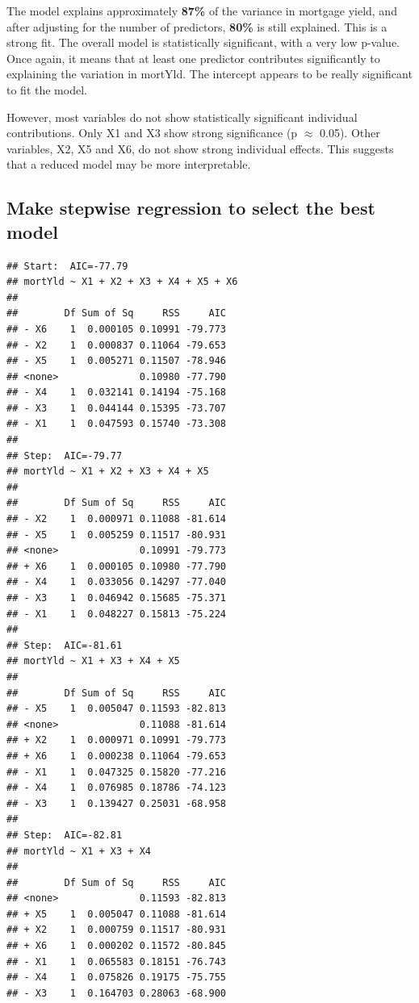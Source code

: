 \documentclass[
  11pt,
]{article}
\begin{document}
The model explains approximately \textbf{87\%} of the variance in
mortgage yield, and after adjusting for the number of predictors,
\textbf{80\%} is still explained. This is a strong fit. The overall
model is statistically significant, with a very low p-value. Once again,
it means that at least one predictor contributes significantly to
explaining the variation in mortYld. The intercept appears to be really
significant to fit the model.

However, most variables do not show statistically significant individual
contributions. Only X1 and X3 show strong significance (p \(\approx\)
0.05). Other variables, X2, X5 and X6, do not show strong individual
effects. This suggests that a reduced model may be more interpretable.

\subsection{Make stepwise regression to select the best
model}\label{make-stepwise-regression-to-select-the-best-model}

\begin{verbatim}
## Start:  AIC=-77.79
## mortYld ~ X1 + X2 + X3 + X4 + X5 + X6
## 
##        Df Sum of Sq     RSS     AIC
## - X6    1  0.000105 0.10991 -79.773
## - X2    1  0.000837 0.11064 -79.653
## - X5    1  0.005271 0.11507 -78.946
## <none>              0.10980 -77.790
## - X4    1  0.032141 0.14194 -75.168
## - X3    1  0.044144 0.15395 -73.707
## - X1    1  0.047593 0.15740 -73.308
## 
## Step:  AIC=-79.77
## mortYld ~ X1 + X2 + X3 + X4 + X5
## 
##        Df Sum of Sq     RSS     AIC
## - X2    1  0.000971 0.11088 -81.614
## - X5    1  0.005259 0.11517 -80.931
## <none>              0.10991 -79.773
## + X6    1  0.000105 0.10980 -77.790
## - X4    1  0.033056 0.14297 -77.040
## - X3    1  0.046942 0.15685 -75.371
## - X1    1  0.048227 0.15813 -75.224
## 
## Step:  AIC=-81.61
## mortYld ~ X1 + X3 + X4 + X5
## 
##        Df Sum of Sq     RSS     AIC
## - X5    1  0.005047 0.11593 -82.813
## <none>              0.11088 -81.614
## + X2    1  0.000971 0.10991 -79.773
## + X6    1  0.000238 0.11064 -79.653
## - X1    1  0.047325 0.15820 -77.216
## - X4    1  0.076985 0.18786 -74.123
## - X3    1  0.139427 0.25031 -68.958
## 
## Step:  AIC=-82.81
## mortYld ~ X1 + X3 + X4
## 
##        Df Sum of Sq     RSS     AIC
## <none>              0.11593 -82.813
## + X5    1  0.005047 0.11088 -81.614
## + X2    1  0.000759 0.11517 -80.931
## + X6    1  0.000202 0.11572 -80.845
## - X1    1  0.065583 0.18151 -76.743
## - X4    1  0.075826 0.19175 -75.755
## - X3    1  0.164703 0.28063 -68.900
\end{verbatim}
\end{document}
